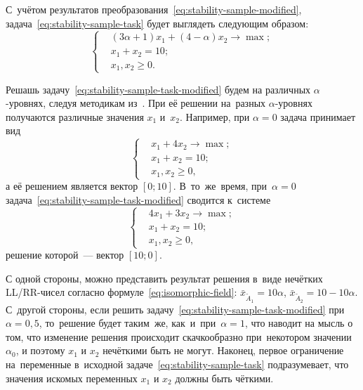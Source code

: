 С~учётом результатов преобразования~\eqref{eq:stability-sample-modified}, задача~\eqref{eq:stability-sample-task} будет выглядеть следующим образом:
\begin{equation}
\label{eq:stability-sample-task-modified}
  \left\{ \begin{aligned}
    & \left( 3\alpha+1\right)x_1+\left(4-\alpha \right)x_2 \to \max; \\
    & x_1 + x_2 = 10; \\
    & x_1, x_2 \geqslant 0.
  \end{aligned} \right.
\end{equation}

Решашь задачу~\eqref{eq:stability-sample-task-modified} будем на различных $\alpha$-уровнях, следуя методикам из~\cite{Matveev_Starodubtsev, Zak}. При её решении на~разных $\alpha$-уровнях получаются различные значения $x_1$ и~$x_2$. Например, при $\alpha=0$ задача принимает вид
\begin{equation*}
  \left\{ \begin{aligned}
    & x_1+4x_2 \to \max; \\
    & x_1 + x_2 = 10; \\
    & x_1, x_2 \geqslant 0,
  \end{aligned} \right.
\end{equation*}
а её решением является вектор $\left[0;10 \right]$. В~то~же~время, при~$\alpha=0$ задача~\eqref{eq:stability-sample-task-modified} сводится к~системе
\begin{equation*}
  \left\{ \begin{aligned}
    & 4x_1+3x_2 \to \max; \\
    & x_1 + x_2 = 10; \\
    & x_1, x_2 \geqslant 0,
  \end{aligned} \right.
\end{equation*}
решение которой~--- вектор $\left[10;0 \right]$.

С одной стороны, можно представить результат решения в~виде нечётких LL/RR-чисел согласно формуле~\eqref{eq:isomorphic-field}: $\bar{x}_{\tilde A_1}=10\alpha$, $\bar{x}_{\tilde A_2}=10-10\alpha$. С~другой стороны, если решить задачу~\eqref{eq:stability-sample-task-modified} при~$\alpha=0,5$, то~решение будет таким~же, как~и~при~$\alpha=1$, что наводит на мысль о том, что изменение решения происходит скачкообразно при~некотором значении $\alpha_0$, и поэтому $x_1$ и $x_2$ нечёткими быть не могут. Наконец, первое ограничение на~переменные в~исходной задаче~\eqref{eq:stability-sample-task} подразумевает, что значения искомых переменных $x_1$ и $x_2$ должны быть чёткими.

